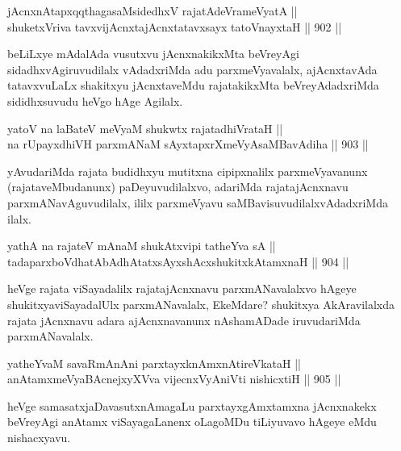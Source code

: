 \begin{shl}
jAcnxnAtapxqqthagasaMsidedhxV rajatAdeVrameVyatA || \\
shuketxVriva tavxvijAcnxtajAcnxtatavxsayx tatoV\s nayxtaH \hfill || 902 ||  
\end{shl}

\begin{artha}
beLiLxye mAdalAda vusutxvu jAcnxnakikxMta beVreyAgi sidadhxvAgiruvudilalx vAdadxriMda adu parxmeVyavalalx, ajAcnxtavAda tatavxvuLaLx shakitxyu jAcnxtaveMdu rajatakikxMta beVreyAdadxriMda sididhxsuvudu heVgo hAge Agilalx.
\end{artha}

\begin{shl}
yatoV na laBateV meVyaM shukwtx rajatadhiVrataH || \\
na rUpayxdhiVH parxmANaM sAyxtapxrXmeVyAsaMBavAdiha \hfill || 903 ||  
\end{shl}

\begin{artha}
yAvudariMda rajata budidhxyu mutitxna cipipxnalilx parxmeVyavanunx (rajataveMbudanunx) paDeyuvudilalxvo, adariMda rajatajAcnxnavu parxmANavAguvudilalx, ililx parxmeVyavu saMBavisuvudilalxvAdadxriMda ilalx.
\end{artha}

\begin{shl}
yathA na rajateV mAnaM shukAtxvipi tatheYva sA || \\
tadaparxboVdhatAbAdhAtatxsAyxshAcxshukitxkAtamxnaH \hfill || 904 ||  
\end{shl}

\begin{artha}
heVge rajata viSayadalilx rajatajAcnxnavu parxmANavalalxvo hAgeye shukitxyaviSayadalUlx parxmANavalalx, EkeMdare? shukitxya AkAravilalxda rajata jAcnxnavu adara ajAcnxnavanunx nAshamADade iruvudariMda parxmANavalalx.
\end{artha}


\begin{shl}
yatheYvaM savaRmAnAni parxtayxknAmxnAtireVkataH || \\
anAtamxmeVyaBAcnejxyXVva vijecnxVyAniVti nishicxtiH \hfill || 905 ||  
\end{shl}

\begin{artha}
heVge samasatxjaDavasutxnAmagaLu parxtayxgAmxtamxna jAcnxnakekx beVreyAgi anAtamx viSayagaLanenx oLagoMDu tiLiyuvavo hAgeye eMdu nishacxyavu.
\end{artha}


